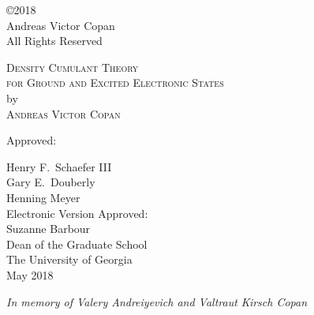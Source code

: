 \documentclass[12pt,notitlepage]{report}
\newcommand{\dissertationtitle}{%
    Density Cumulant Theory\\for Ground and Excited Electronic States}
\newcommand{\whoami}{Andreas Victor Copan}
\begin{document}
\newpage
\thispagestyle{empty}
\vspace*{5.5in}
\begin{center}
\copyright 2018 \\
\whoami \\
All Rights Reserved
\end{center}

\newpage
\thispagestyle{empty}
\vspace*{18pt}
\begin{center}
\textsc{\large{\dissertationtitle}}\\[18pt]
by\\[18pt]
\textsc{\whoami}
\end{center}
\vfill
\begin{flushleft}\singlespacing
\hskip 200pt {Approved:}\\
\vspace{12pt}

\hspace*{200pt}Henry F.~Schaefer III\\
\vspace{12pt}
\hspace*{200pt}Gary E.~Douberly\\
\hspace*{200pt}\makebox[100pt][l]{}Henning Meyer\\
\vfill
Electronic Version Approved:\\[12pt]
Suzanne Barbour\\
Dean of the Graduate School\\
The University of Georgia\\
May 2018
\end{flushleft}

\newpage
\vspace*{1.5in}
\begin{center}
\emph{In memory of Valery Andreiyevich and Valtraut Kirsch Copan}\\
\vspace{6pt}
\end{center}

%

\tableofcontents
\clearpage
{}








\newpage


\end{document}
